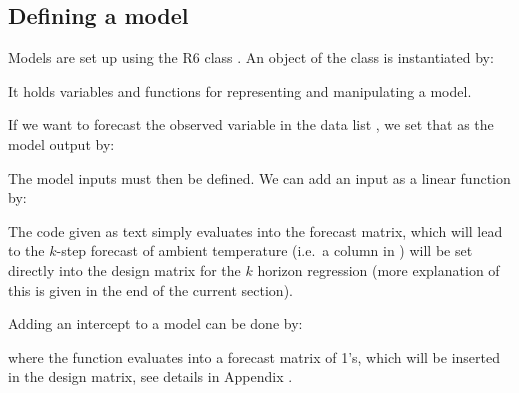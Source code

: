 \subsection{Defining a model} \label{sec:defining-model}

Models are set up using the R6 class . An object
of the class is instantiated by:
\begin{knitrout}
\color{fgcolor}\begin{kframe}
\begin{alltt}
 \hlkwb{<-} \hlopt{\$}\hlstd{()}
\end{alltt}
\end{kframe}
\end{knitrout}
\noindent It holds variables and functions for representing and manipulating a model.

\noindent If we want to forecast the observed  variable in the
data list , we set that as the model output by:
\begin{knitrout}
\color{fgcolor}\begin{kframe}
\begin{alltt}
\hlopt{\$} \hlkwb{<-} 
\end{alltt}
\end{kframe}
\end{knitrout}


\noindent The model inputs must then be defined. We can add an input as a linear function by:
\begin{knitrout}
\color{fgcolor}\begin{kframe}
\begin{alltt}
\hlopt{\$}\hlstd{(} \hlstd{=} \hlstd{)}
\end{alltt}
\end{kframe}
\end{knitrout}
\noindent The code given as text simply evaluates into the  forecast
matrix, which will lead to the $k$-step forecast of ambient temperature (i.e.\
a column in ) will be
set directly into the design matrix for the $k$ horizon regression (more
explanation of this is given in the end of the current section).

\noindent Adding an intercept to a model can be done by:
\begin{knitrout}
\color{fgcolor}\begin{kframe}
\begin{alltt}
\hlopt{\$}\hlstd{(} \hlstd{=} \hlstd{)}
\end{alltt}
\end{kframe}
\end{knitrout}
\noindent where the function  evaluates into a forecast
matrix of 1's, which will be inserted in the design matrix, see details in Appendix . 

